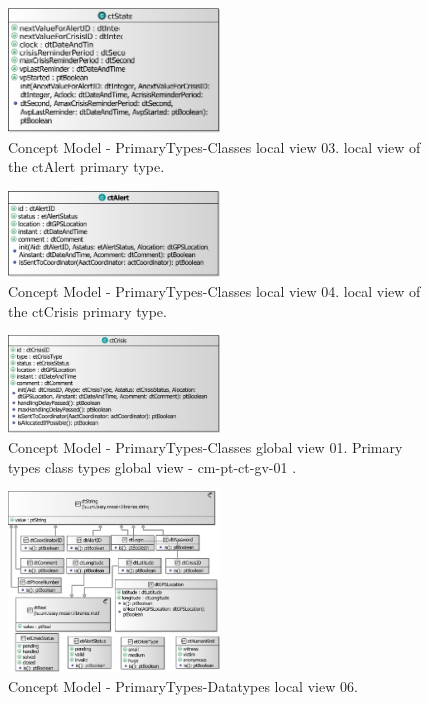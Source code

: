 \begin{figure}[H]
	\centering
	\captionsetup{justification=centering}
	\includegraphics[width=0.5\textwidth]{./images/cm-pt-ct-lv-02-parta-ctState.eps}
	\caption{Concept Model - PrimaryTypes-Classes local view 03. local view of the ctAlert primary
type.}
\end{figure} 

\begin{figure}[H]
	\centering
	\captionsetup{justification=centering}
	\includegraphics[width=0.5\textwidth]{./images/cm-pt-ct-lv-03-partb-ctAlert.eps}
	\caption{Concept Model - PrimaryTypes-Classes local view 04. local view of the ctCrisis primary
type.}
\end{figure} 

\begin{figure}[H]
	\centering
	\captionsetup{justification=centering}
	\includegraphics[width=0.5\textwidth]{./images/cm-pt-ct-lv-04-partc-ctCrisis.eps}
	\caption{Concept Model - PrimaryTypes-Classes global view 01. Primary types class types global
view - cm-pt-ct-gv-01 .}
\end{figure} 

\begin{figure}[H]
	\centering
	\captionsetup{justification=centering}
	\includegraphics[width=0.5\textwidth]{./images/cm-pt-dt-gv-01.eps}
	\caption{Concept Model - PrimaryTypes-Datatypes local view 06.}
\end{figure} 

